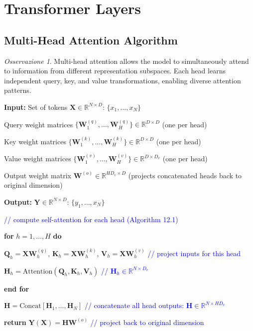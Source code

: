 \documentclass[11pt,a4paper]{article}
\theoremstyle{definition}
\theoremstyle{plain}
\theoremstyle{remark}
\newtheorem*{observation}{Osservazione}
\begin{document}
\section{Transformer Layers}

\subsection{Multi-Head Attention Algorithm}

\begin{observation}
Multi-head attention allows the model to simultaneously attend to information from different representation subspaces. Each head learns independent query, key, and value transformations, enabling diverse attention patterns.
\end{observation}

\begin{tcolorbox}[colback=red!10!white,colframe=red!75!black,title=\textbf{Algorithm 12.2: Multi-head attention}]
\textbf{Input:} Set of tokens $\mathbf{X} \in \mathbb{R}^{N \times D}$: $\{x_1, \ldots, x_N\}$

Query weight matrices $\{\mathbf{W}_1^{(q)}, \ldots, \mathbf{W}_H^{(q)}\} \in \mathbb{R}^{D \times D}$ (one per head)

Key weight matrices $\{\mathbf{W}_1^{(k)}, \ldots, \mathbf{W}_H^{(k)}\} \in \mathbb{R}^{D \times D}$ (one per head)

Value weight matrices $\{\mathbf{W}_1^{(v)}, \ldots, \mathbf{W}_H^{(v)}\} \in \mathbb{R}^{D \times D_v}$ (one per head)

Output weight matrix $\mathbf{W}^{(o)} \in \mathbb{R}^{HD_v \times D}$ (projects concatenated heads back to original dimension)

\textbf{Output:} $\mathbf{Y} \in \mathbb{R}^{N \times D}$: $\{y_1, \ldots, x_N\}$

\vspace{0.3cm}

\textcolor{blue}{// compute self-attention for each head (Algorithm 12.1)}

\textbf{for} $h = 1, \ldots, H$ \textbf{do}

\quad $\mathbf{Q}_h = \mathbf{X}\mathbf{W}_h^{(q)}$, $\mathbf{K}_h = \mathbf{X}\mathbf{W}_h^{(k)}$, $\mathbf{V}_h = \mathbf{X}\mathbf{W}_h^{(v)}$ \textcolor{blue}{// project inputs for this head}

\quad $\mathbf{H}_h = \text{Attention}(\mathbf{Q}_h, \mathbf{K}_h, \mathbf{V}_h)$ \textcolor{blue}{// $\mathbf{H}_h \in \mathbb{R}^{N \times D_v}$}

\textbf{end for}

$\mathbf{H} = \text{Concat}[\mathbf{H}_1, \ldots, \mathbf{H}_N]$ \textcolor{blue}{// concatenate all head outputs: $\mathbf{H} \in \mathbb{R}^{N \times HD_v}$}

\textbf{return} $\mathbf{Y}(\mathbf{X}) = \mathbf{H}\mathbf{W}^{(o)}$ \textcolor{blue}{// project back to original dimension}
\end{tcolorbox}
\end{document}
